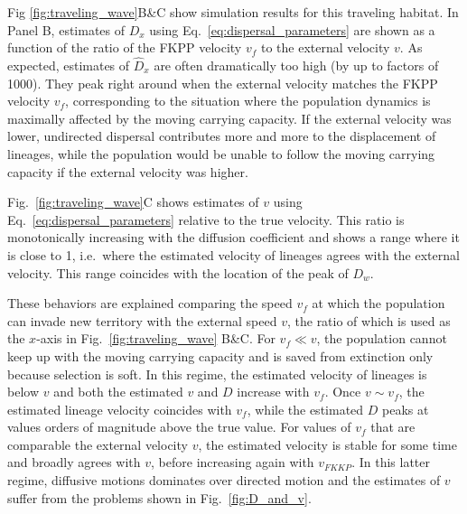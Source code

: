 \documentclass[aps,rmp, twocolumn]{revtex4}
\newcommand{\vfkpp}{v_f}
\begin{document}
Fig \ref{fig:traveling_wave}B\&C show simulation results for this traveling habitat. In Panel B, estimates of $D_x$ using Eq.~\ref{eq:dispersal_parameters} are shown as a function of the ratio of the FKPP velocity $v_f$ to the external velocity $v$.
As expected, estimates of $\hat{D}_x$ are often dramatically too high (by up to factors of 1000).
They peak right around when the external velocity matches the FKPP velocity $\vfkpp$, corresponding to the situation where the population dynamics is maximally affected by the moving carrying capacity.
If the external velocity was lower, undirected dispersal contributes more and more to the displacement of lineages, while the population would be unable to follow the moving carrying capacity if the external velocity was higher.

Fig.~\ref{fig:traveling_wave}C shows estimates of $v$ using Eq.~\ref{eq:dispersal_parameters} relative to the true velocity.
This ratio is monotonically increasing with the diffusion coefficient and shows a range where it is close to 1, i.e.~where the estimated velocity of lineages agrees with the external velocity.
This range coincides with the location of the peak of $D_w$.

These behaviors are explained comparing the speed $\vfkpp$ at which the population can invade new territory with the external speed $v$, the ratio of which is used as the $x$-axis in Fig.~\ref{fig:traveling_wave} B\&C.
For $\vfkpp \ll v$, the population cannot keep up with the moving carrying capacity and is saved from extinction only because selection is soft.
In this regime, the estimated velocity of lineages is below $v$ and both the estimated $v$ and $D$ increase with $\vfkpp$.
Once $v\sim \vfkpp$, the estimated lineage velocity coincides with $\vfkpp$, while the estimated $D$ peaks at values orders of magnitude above the true value.
For values of $\vfkpp$ that are comparable the external velocity $v$, the estimated velocity is stable for some time and broadly agrees with $v$, before increasing again with $v_{FKKP}$.
In this latter regime, diffusive motions dominates over directed motion and the estimates of $v$ suffer from the problems shown in Fig.~\ref{fig:D_and_v}.
\end{document}
